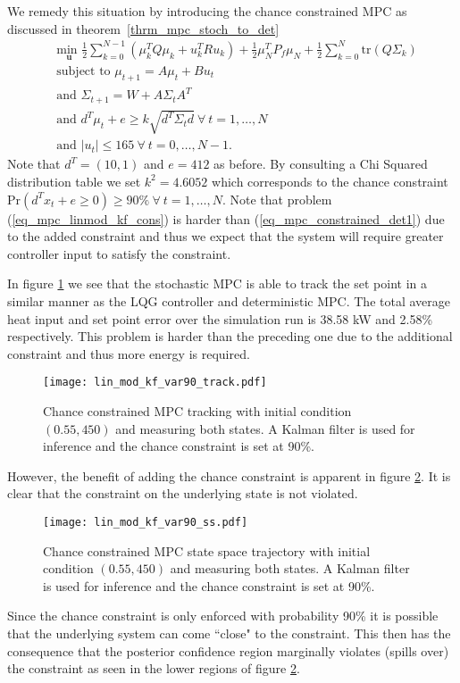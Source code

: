 We remedy this situation by introducing the chance constrained MPC as discussed in theorem~\ref{thrm_mpc_stoch_to_det}
\begin{equation}
\begin{aligned}
&\underset{\mathbf{u}}{\text{min }} \frac{1}{2}\sum_{k=0}^{N-1} \left( \mu_k^TQ\mu_k + u_k^TRu_k \right) + \frac{1}{2}\mu_N^TP_f\mu_N + \frac{1}{2}\sum_{k=0}^N \text{tr}(Q\Sigma_k) \\
& \text{subject to } \mu_{t+1}=A\mu_t + Bu_t \\
& \text{and } \Sigma_{t+1} = W+A\Sigma_t A^T \\
& \text{and } d^T\mu_t + e \geq k\sqrt{d^T \Sigma_t d} ~\forall ~t=1,\hdots,N\\
& \text{and } |u_t| \leq 165 ~\forall ~t=0,\hdots,N-1.
\end{aligned}
\label{eq_mpc_linmod_kf_cons}
\end{equation}
Note that $d^T = (10, 1)$ and $e=412$ as before. By consulting a Chi Squared distribution table we set $k^2 = 4.6052$ which corresponds to the chance constraint $\text{Pr}(d^Tx_t + e \geq 0) \geq 90\% ~\forall ~t=1,\hdots,N$. Note that problem (\ref{eq_mpc_linmod_kf_cons}) is harder than (\ref{eq_mpc_constrained_det1}) due to the added constraint and thus we expect that the system will require greater controller input to satisfy the constraint. 

In figure \ref{fig_lin_mod_kf_var90_track} we see that the stochastic MPC is able to track the set point in a similar manner as the LQG controller and deterministic MPC. The total average heat input and set point error over the simulation run is  38.58 kW and 2.58\% respectively. This problem is harder than the preceding one due to the additional constraint and thus more energy is required. 
\begin{figure}[H] 
\centering
\texttt{[image: lin\_mod\_kf\_var90\_track.pdf]}
\caption{Chance constrained MPC tracking with initial condition $(0.55, 450)$ and measuring both states. A Kalman filter is used for inference and the chance constraint is set at 90\%.}
\label{fig_lin_mod_kf_var90_track}
\end{figure}
However, the benefit of adding the chance constraint is apparent in figure \ref{fig_lin_mod_kf_var90_ss}. It is clear that the constraint on the underlying state is not violated.
\begin{figure}[H] 
\centering
\texttt{[image: lin\_mod\_kf\_var90\_ss.pdf]}
\caption{Chance constrained MPC state space trajectory with initial condition $(0.55, 450)$ and measuring both states. A Kalman filter is used for inference and the chance constraint is set at 90\%.}
\label{fig_lin_mod_kf_var90_ss}
\end{figure}
Since the chance constraint is only enforced with probability 90\% it is possible that the underlying system can come ``close" to the constraint. This then has the consequence that the posterior confidence region marginally violates (spills over) the constraint as seen in the lower regions of figure \ref{fig_lin_mod_kf_var90_ss}.
 
